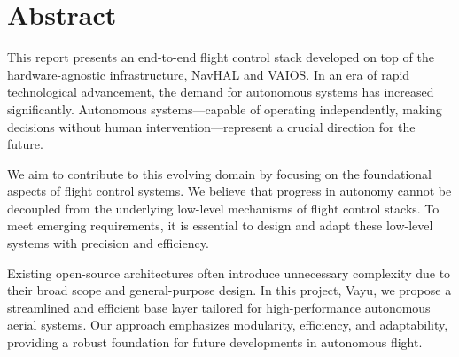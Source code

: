 \chapter*{Abstract}

This report presents an end-to-end flight control stack developed on top of the hardware-agnostic infrastructure, NavHAL and VAIOS. In an era of rapid technological advancement, the demand for autonomous systems has increased significantly. Autonomous systems—capable of operating independently, making decisions without human intervention—represent a crucial direction for the future.

We aim to contribute to this evolving domain by focusing on the foundational aspects of flight control systems. We believe that progress in autonomy cannot be decoupled from the underlying low-level mechanisms of flight control stacks. To meet emerging requirements, it is essential to design and adapt these low-level systems with precision and efficiency.

Existing open-source architectures often introduce unnecessary complexity due to their broad scope and general-purpose design. In this project, Vayu, we propose a streamlined and efficient base layer tailored for high-performance autonomous aerial systems. Our approach emphasizes modularity, efficiency, and adaptability, providing a robust foundation for future developments in autonomous flight.